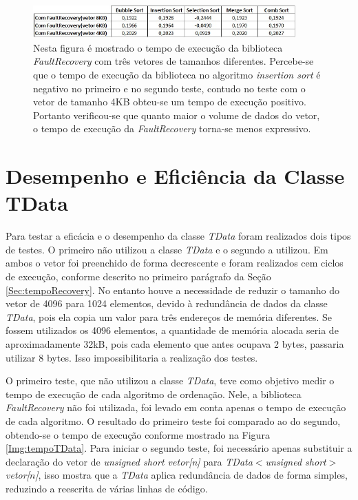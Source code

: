 \begin{figure}[h]
	\centering
	\includegraphics[width=0.9\textwidth]{figuras/tempoRecovery2.jpg}
	\caption[Tempo de execução da biblioteca \textit{FaultRecovery} com três tamanhos de vetores diferentes.]{Nesta figura é mostrado o tempo de execução da biblioteca \textit{FaultRecovery} com três vetores de tamanhos diferentes. Percebe-se que o tempo de execução da biblioteca no algoritmo \textit{insertion sort} é negativo no primeiro e no segundo teste, contudo no teste com o vetor de tamanho 4KB obteu-se um tempo de execução positivo. Portanto verificou-se que quanto maior o volume de dados do vetor, o tempo de execução da \textit{FaultRecovery} torna-se menos expressivo.}
	\label{Img:tempoRecovery2}	
\end{figure}
\newpage
\section{Desempenho e Eficiência da Classe TData} \label{Sec:tempoTData}

Para testar a eficácia e o desempenho da classe \textit{TData} foram realizados dois tipos de testes. O primeiro não utilizou a classe \textit{TData} e o segundo a utilizou. Em ambos o vetor foi preenchido de forma decrescente e foram realizados cem ciclos de execução, conforme descrito no primeiro parágrafo da Seção \ref{Sec:tempoRecovery}. No entanto houve a necessidade de reduzir o tamanho do vetor de 4096 para 1024 elementos, devido à redundância de dados da classe \textit{TData}, pois ela copia um valor para três endereços de memória diferentes. Se fossem utilizados os 4096 elementos, a quantidade de memória alocada seria de aproximadamente 32kB, pois cada elemento que antes ocupava 2 bytes, passaria  utilizar 8 bytes. Isso impossibilitaria a realização dos testes. 


O primeiro teste, que não utilizou a classe \textit{TData}, teve como objetivo medir o tempo de execução de cada algoritmo de ordenação. Nele, a biblioteca \textit{FaultRecovery} não foi utilizada, foi levado em conta apenas o tempo de execução de cada algoritmo. O resultado do primeiro teste foi comparado ao do segundo, obtendo-se o tempo de execução conforme mostrado na Figura \ref{Img:tempoTData}. Para iniciar o segundo teste, foi necessário apenas substituir a declaração do vetor de \textit{unsigned short vetor[n]} para \textit{TData$<$unsigned short$>$ vetor[$n$]}, isso mostra que a \textit{TData} aplica redundância de dados de forma simples, reduzindo a reescrita de várias linhas de código.

